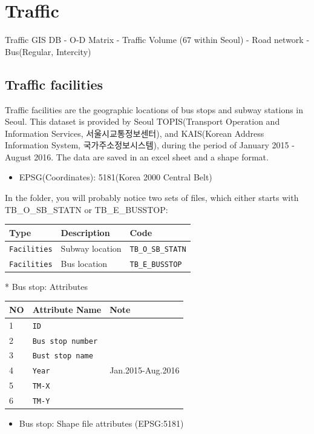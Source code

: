 \documentclass[]{book}
\providecommand{\tightlist}{%
  \setlength{\itemsep}{0pt}\setlength{\parskip}{0pt}}
\begin{document}
\chapter{Traffic}\label{traffic}

Traffic GIS DB - O-D Matrix - Traffic Volume (67 within Seoul) - Road
network - Bus(Regular, Intercity)

\section{Traffic facilities}\label{traffic-facilities}

Traffic facilities are the geographic locations of bus stops and subway
stations in Seoul. This dataset is provided by Seoul TOPIS(Transport
Operation and Information Services, 서울시교통정보센터), and KAIS(Korean
Address Information System, 국가주소정보시스템), during the period of
January 2015 - August 2016. The data are saved in an excel sheet and a
shape format.

\begin{itemize}
\tightlist
\item
  EPSG(Coordinates): 5181(Korea 2000 Central Belt)
\end{itemize}

In the folder, you will probably notice two sets of files, which either
starts with TB\_O\_SB\_STATN or TB\_E\_BUSSTOP:

\begin{longtable}[]{@{}lll@{}}
\toprule
Type & Description & Code\tabularnewline
\midrule
\endhead
\texttt{Facilities} & Subway location &
\texttt{TB\_O\_SB\_STATN}\tabularnewline
\texttt{Facilities} & Bus location &
\texttt{TB\_E\_BUSSTOP}\tabularnewline
\bottomrule
\end{longtable}

 * Bus stop: Attributes

\begin{longtable}[]{@{}lll@{}}
\toprule
NO & Attribute Name & Note\tabularnewline
\midrule
\endhead
1 & \texttt{ID} &\tabularnewline
2 & \texttt{Bus\ stop\ number} &\tabularnewline
3 & \texttt{Bust\ stop\ name} &\tabularnewline
4 & \texttt{Year} & Jan.2015-Aug.2016\tabularnewline
5 & \texttt{TM-X} &\tabularnewline
6 & \texttt{TM-Y} &\tabularnewline
\bottomrule
\end{longtable}

\begin{itemize}
\tightlist
\item
  Bus stop: Shape file attributes (EPSG:5181)
\end{itemize}
\end{document}
